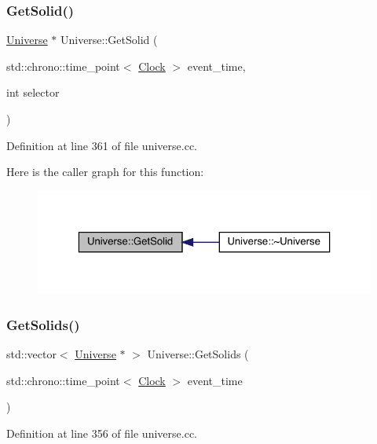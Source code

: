 \subsubsection{\texorpdfstring{Get\+Solid()}{GetSolid()}}
{\footnotesize\ttfamily \hyperlink{class_universe}{Universe} $\ast$ Universe\+::\+Get\+Solid (\begin{DoxyParamCaption}\item[{std\+::chrono\+::time\+\_\+point$<$ \hyperlink{universe_8h_a0ef8d951d1ca5ab3cfaf7ab4c7a6fd80}{Clock} $>$}]{event\+\_\+time,  }\item[{int}]{selector }\end{DoxyParamCaption})}



Definition at line 361 of file universe.\+cc.

Here is the caller graph for this function\+:
\nopagebreak
\begin{figure}[H]
\begin{center}
\leavevmode
\includegraphics[width=323pt]{class_universe_a9f7b74fc21d45ddaa78aa18e9a337bcd_icgraph}
\end{center}
\end{figure}
\mbox{\label{class_universe_a669fc068dd7820a5af309bfbe67199aa}} 
\subsubsection{\texorpdfstring{Get\+Solids()}{GetSolids()}}
{\footnotesize\ttfamily std\+::vector$<$ \hyperlink{class_universe}{Universe} $\ast$ $>$ Universe\+::\+Get\+Solids (\begin{DoxyParamCaption}\item[{std\+::chrono\+::time\+\_\+point$<$ \hyperlink{universe_8h_a0ef8d951d1ca5ab3cfaf7ab4c7a6fd80}{Clock} $>$}]{event\+\_\+time }\end{DoxyParamCaption})}



Definition at line 356 of file universe.\+cc.

